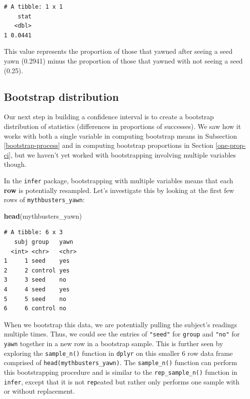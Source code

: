 \documentclass[12pt, krantz2,]{krantz}
\makeatletter
\newenvironment{Shaded}{\begin{snugshade}}{\end{snugshade}}
\newcommand{\KeywordTok}[1]{\textcolor[rgb]{0.27,0.27,0.27}{\textbf{#1}}}
\newcommand{\NormalTok}[1]{#1}
\newenvironment{kframe}{%
\medskip{}
\setlength{\fboxsep}{.8em}
 \def\at@end@of@kframe{}%
 \ifinner\ifhmode%
  \def\at@end@of@kframe{\end{minipage}}%
  \begin{minipage}{\columnwidth}%
 \fi\fi%
 \def\FrameCommand##1{\hskip\@totalleftmargin \hskip-\fboxsep
 \colorbox{shadecolor}{##1}\hskip-\fboxsep
     \hskip-\linewidth \hskip-\@totalleftmargin \hskip\columnwidth}%
 \MakeFramed {\advance\hsize-\width
   \@totalleftmargin\z@ \linewidth\hsize
   \@setminipage}}%
 {\par\unskip\endMakeFramed%
 \at@end@of@kframe}
\renewenvironment{Shaded}{\begin{kframe}}{\end{kframe}}
\makeatother
\begin{document}
\begin{verbatim}
# A tibble: 1 x 1
    stat
   <dbl>
1 0.0441
\end{verbatim}

This value represents the proportion of those that yawned after seeing a seed yawn (0.2941) minus the proportion of those that yawned with not seeing a seed (0.25).

\hypertarget{bootstrap-distribution-2}{%
\subsection{Bootstrap distribution}\label{bootstrap-distribution-2}}

Our next step in building a confidence interval is to create a bootstrap distribution of statistics (differences in proportions of successes). We saw how it works with both a single variable in computing bootstrap means in Subsection \ref{bootstrap-process} and in computing bootstrap proportions in Section \ref{one-prop-ci}, but we haven't yet worked with bootstrapping involving multiple variables though.

In the \texttt{infer} package, bootstrapping with multiple variables means that each \textbf{row} is potentially resampled. Let's investigate this by looking at the first few rows of \texttt{mythbusters\_yawn}:

\begin{Shaded}
\begin{Highlighting}[]
\KeywordTok{head}\NormalTok{(mythbusters_yawn)}
\end{Highlighting}
\end{Shaded}

\begin{verbatim}
# A tibble: 6 x 3
   subj group   yawn 
  <int> <chr>   <chr>
1     1 seed    yes  
2     2 control yes  
3     3 seed    no   
4     4 seed    yes  
5     5 seed    no   
6     6 control no   
\end{verbatim}

When we bootstrap this data, we are potentially pulling the subject's readings multiple times. Thus, we could see the entries of \texttt{"seed"} for \texttt{group} and \texttt{"no"} for \texttt{yawn} together in a new row in a bootstrap sample. This is further seen by exploring the \texttt{sample\_n()} function in \texttt{dplyr} on this smaller 6 row data frame comprised of \texttt{head(mythbusters\_yawn)}. The \texttt{sample\_n()} function can perform this bootstrapping procedure and is similar to the \texttt{rep\_sample\_n()} function in \texttt{infer}, except that it is not \texttt{rep}eated but rather only performs one sample with or without replacement.
\end{document}

